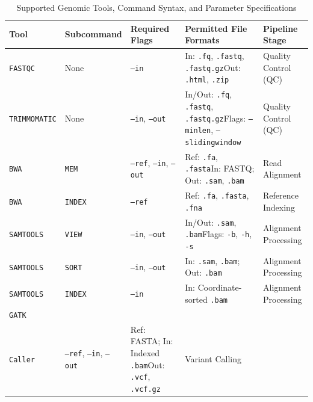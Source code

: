 \documentclass[12pt,a4paper]{article}
\begin{document}
\begin{table}[H]
\centering
\footnotesize
\setlength{\tabcolsep}{3pt}
\renewcommand{\arraystretch}{1.18}
\caption{Supported Genomic Tools, Command Syntax, and Parameter Specifications}
\label{tab:tool_spec}
\begin{tabularx}{\textwidth}{>{\raggedright\arraybackslash}p{2.35cm} >{\raggedright\arraybackslash}p{2.2cm} >{\raggedright\arraybackslash}p{2.45cm} >{\raggedright\arraybackslash}X >{\raggedright\arraybackslash}p{2.05cm}}
\toprule
\textbf{Tool} & \textbf{Subcommand} & \textbf{Required Flags} & \textbf{Permitted File Formats} & \textbf{Pipeline Stage} \\
\midrule
\texttt{FASTQC} & None & \texttt{--in} & In: \texttt{.fq}, \texttt{.fastq}, \texttt{.fastq.gz}\newline Out: \texttt{.html}, \texttt{.zip} & Quality Control (QC) \\
\addlinespace
\texttt{TRIMMOMATIC} & None & \texttt{--in}, \texttt{--out} & In/Out: \texttt{.fq}, \texttt{.fastq}, \texttt{.fastq.gz}\newline Flags: \texttt{--minlen}, \texttt{--slidingwindow} & Quality Control (QC) \\
\addlinespace
\texttt{BWA} & \texttt{MEM} & \texttt{--ref}, \texttt{--in}, \texttt{--out} & Ref: \texttt{.fa}, \texttt{.fasta}\newline In: FASTQ; Out: \texttt{.sam}, \texttt{.bam} & Read Alignment \\
\addlinespace
\texttt{BWA} & \texttt{INDEX} & \texttt{--ref} & Ref: \texttt{.fa}, \texttt{.fasta}, \texttt{.fna} & Reference Indexing \\
\addlinespace
\texttt{SAMTOOLS} & \texttt{VIEW} & \texttt{--in}, \texttt{--out} & In/Out: \texttt{.sam}, \texttt{.bam}\newline Flags: \texttt{-b}, \texttt{-h}, \texttt{-s} & Alignment Processing \\
\addlinespace
\texttt{SAMTOOLS} & \texttt{SORT} & \texttt{--in}, \texttt{--out} & In: \texttt{.sam}, \texttt{.bam}; Out: \texttt{.bam} & Alignment Processing \\
\addlinespace
\texttt{SAMTOOLS} & \texttt{INDEX} & \texttt{--in} & In: Coordinate-sorted \texttt{.bam} & Alignment Processing \\
\addlinespace
\texttt{GATK} & \makecell[l]{\texttt{Haplotype}\\\texttt{Caller}} & \texttt{--ref}, \texttt{--in}, \texttt{--out} & Ref: FASTA; In: Indexed \texttt{.bam}\newline Out: \texttt{.vcf}, \texttt{.vcf.gz} & Variant Calling \\

\end{tabularx}
\end{table}
\end{document}
